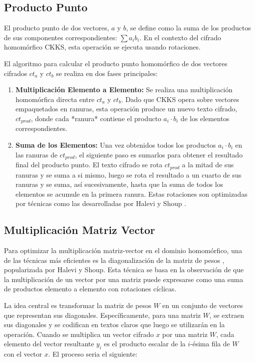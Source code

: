 \subsection{Producto Punto}

El producto punto de dos vectores, $a$ y $b$, se define como la suma de los productos de sus componentes correspondientes: $\sum a_i b_i$. En el contexto del cifrado homomórfico CKKS, esta operación se ejecuta usando rotaciones.

El algoritmo para calcular el producto punto homomórfico de dos vectores cifrados $ct_a$ y $ct_b$ se realiza en dos fases principales:

\begin{enumerate}
    \item \textbf{Multiplicación Elemento a Elemento:}
        Se realiza una multiplicación homomórfica directa entre $ct_a$ y $ct_b$. Dado que CKKS opera sobre vectores empaquetados en ranuras, esta operación produce un nuevo texto cifrado, $ct_{prod}$, donde cada *ranura* contiene el producto $a_i \cdot b_i$ de los elementos correspondientes.

    \item \textbf{Suma de los Elementos:}
        Una vez obtenidos todos los productos $a_i \cdot b_i$ en las ranuras de $ct_{prod}$, el siguiente paso es sumarlos para obtener el resultado final del producto punto. El texto cifrado se rota $ct_{prod}$ a la mitad de sus ranuras y se suma a si mismo, luego se rota el resultado a un cuarto de sus ranuras y se suma, así sucesivamente, hasta que la suma de todos los elementos se acumule en la primera ranura. Estas rotaciones son optimizadas por técnicas como las desarrolladas por Halevi y Shoup \cite{Halevi14}.
\end{enumerate}


\subsection{Multiplicación Matriz Vector}

Para optimizar la multiplicación matriz-vector en el dominio homomórfico, una de las técnicas más eficientes es la diagonalización de la matriz de pesos \cite{Halevi14}, popularizada por Halevi y Shoup. Esta técnica se basa en la observación de que la multiplicación de un vector por una matriz puede expresarse como una suma de productos elemento a elemento \cite{Goodfellow16} con rotaciones cíclicas.

La idea central es transformar la matriz de pesos $W$ en un conjunto de vectores que representan sus diagonales. Específicamente, para una matriz $W$, se extraen sus diagonales y se codifican en textos claros que luego se utilizarán en la operación. Cuando se multiplica un vector cifrado $x$ por una matriz $W$, cada elemento del vector resultante $y_i$ es el producto escalar de la $i$-ésima fila de $W$ con el vector $x$. El proceso seria el siguiente:

